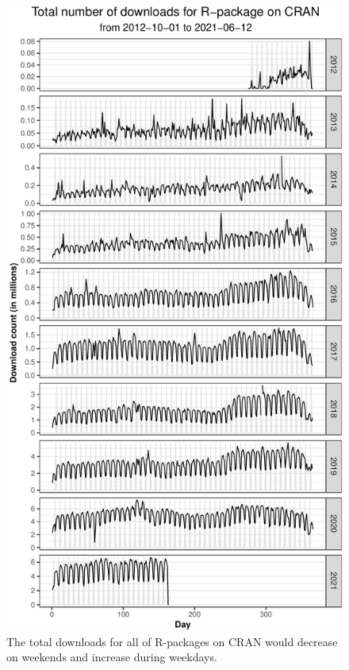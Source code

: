 \documentclass[
]{book}
\begin{document}
\begin{figure}

{\centering \includegraphics{figures/total-trend-1} 

}

\caption{The total downloads for all of R-packages on CRAN would decrease on weekends and increase during weekdays.}\label{fig:total-trend}
\end{figure}
\end{document}
